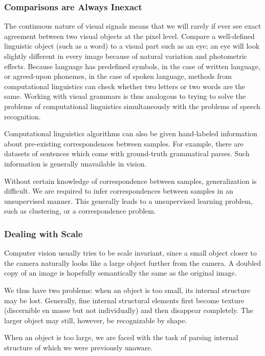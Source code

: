 \documentclass{article}
\begin{document}
\subsubsection{Comparisons are Always Inexact}

The continuous nature of visual signals means that we will rarely if
ever see exact agreement between two visual objects at the pixel
level. Compare a well-defined linguistic object (such as a word) to a
visual part such as an eye; an eye will look slightly different in
every image because of natural variation and photometric
effects. Because language has predefined symbols, in the case of
written language, or agreed-upon phonemes, in the case of spoken
language, methods from computational linguistics can check whether two
letters or two words are the same. Working with visual grammars is
thus analogous to trying to solve the problems of computational
linguistics simultaneously with the problems of speech recognition.

Computational linguistics algorithms can also be given hand-labeled
information about pre-existing correspondences between samples. For
example, there are datasets of sentences which come with ground-truth
grammatical parses. Such information is generally unavailable in
vision. 

Without certain knowledge of correspondence between samples,
generalization is difficult. We are required to infer correspondences
between samples in an unsupervised manner. This generally leads to a
unsupervised learning problem, such as clustering, or a correspondence
problem.

\subsubsection{Dealing with Scale}

Computer vision usually tries to be scale invariant, since a small
object closer to the camera naturally looks like a large object
further from the camera. A doubled copy of an image is hopefully
semantically the same as the original image.

We thus have two problems: when an object is too small, its internal
structure may be lost. Generally, fine internal structural elements
first become texture (discernible en masse but not individually) and
then disappear completely. The larger object may still, however, be
recognizable by shape.

When an object is too large, we are faced with the task of parsing
internal structure of which we were previously unaware.
\end{document}
